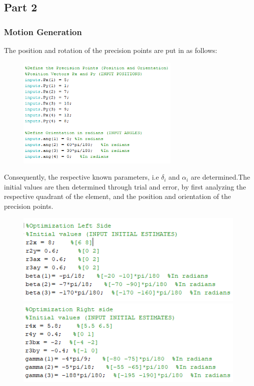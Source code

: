 \documentclass[12pt]{article}
\begin{document}
\subsection{Part 2}
\subsubsection{Motion Generation}
The position and rotation of the precision points are put in as follows:
\begin{figure}[h!]
    \centering
    \includegraphics[width=0.7\textwidth]{MG_5.png}
\end{figure}

Consequently, the respective known parameters, i.e $\delta_i$ and $\alpha_i$ are determined.The initial values are then determined through trial and error, by first analyzing the respective quadrant of the element, and the position and orientation of the precision points.
\begin{figure}[h!]
    \centering
    \begin{minipage}{.5\textwidth}
        \centering
        \includegraphics[width=1\textwidth]{MG_6.png}
    \end{minipage}%
    \begin{minipage}{0.5\textwidth}
        \centering
        \includegraphics[width=1\textwidth]{MG_7.png}
    \end{minipage}
\end{figure}
\end{document}
